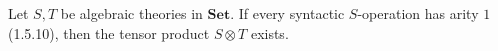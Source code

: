 Let $S, T$ be algebraic theories in $\mathbf{Set}$. If every syntactic $S$-operation has arity $1$ (1.5.10), then the tensor product $S \otimes T$ exists.
